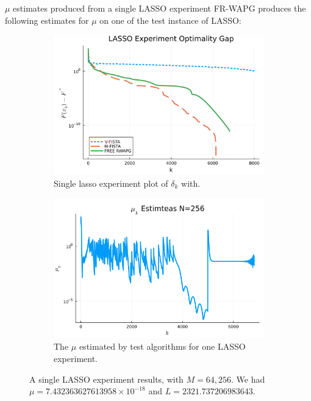\documentclass[11pt]{beamer}
\theoremstyle{definition}
\begin{document}
        \begin{frame}{$\mu$ estimates produced from a single LASSO experiment}
            FR-WAPG produces the following estimates for $\mu$ on one of the test instance of LASSO: 
            \begin{figure}[H]
                \begin{subfigure}[b]{0.47\textwidth}
                    \includegraphics[width=\textwidth]{assets/lasso_loss_256.png}
                    \caption{Single lasso experiment plot of $\delta_k$ with.  }
                \end{subfigure}
                \hfill
                \begin{subfigure}[b]{0.47\textwidth}
                    \includegraphics[width=\textwidth]{assets/lasso_sc_estimates_256.png}
                    \caption{The $\mu$ estimated by test algorithms for one LASSO experiment. }
                \end{subfigure}
                \caption{
                    A single LASSO experiment results, with $M = 64, 256$. 
                    We had $\mu = 7.432363627613958\times 10^{-18}$ and $L = 2321.737206983643$.
                }
                \label{fig:single-lass-mu-estimates}
            \end{figure}
        \end{frame}
\end{document}
